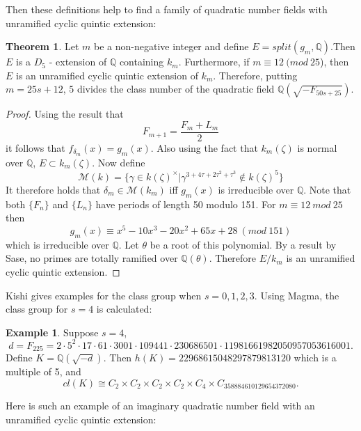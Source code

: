 \documentclass[12pt]{extarticle}
\newcommand{\Q}{\mathbb{Q}}
\newcommand{\<}{\langle}
\renewcommand{\>}{\rangle}
\theoremstyle{definition}
\newtheorem{theorem}{Theorem}
\newtheorem{example}{Example}
\begin{document}
Then these definitions help to find a family of quadratic number fields with unramified cyclic quintic extension:
\begin{theorem}
    Let $m$ be a non-negative integer and define $E = split(g_m,\Q)$.Then $E$ is a $D_5$ - extension
of $\Q$ containing $k_m$. Furthermore, if $m \equiv 12 \:(mod\:25$), then $E$ is an unramified cyclic quintic extension of $k_m$. Therefore, putting $m = 25s + 12$, $5$ divides the class number of the quadratic field $\Q(\sqrt{-F_{50s+25}})$.
\end{theorem}
\begin{proof}
Using the result that \begin{equation}
    F_{m+1}= \frac{F_m + L_m}{2}
\end{equation}
it follows that $f_{\delta_m}(x) = g_m(x)$. Also using the fact that $k_m(\zeta)$ is normal over $\Q$, $E\subset k_m(\zeta)$. Now define \begin{equation}
    \mathcal{M}(k)=\{\gamma \in k(\zeta)^{\times}|\gamma^{3+4\tau+2\tau^{2}+\tau^3}\notin k(\zeta)^5\}
\end{equation}
It therefore holds that $\delta_m \in \mathcal{M}(k_m)$ iff $g_m(x)$ is irreducible over $\Q$. Note that both $\{F_n\}$ and $\{L_n\}$ have periods of length 50 modulo 151. For $m\equiv12 \: mod \: 25$ then \begin{equation}
    g_m(x) \equiv x^5 - 10x^3 - 20x^2 + 65x + 28\:(mod \:151)
\end{equation} which is irreducible over $\Q$. Let $\theta$ be a root of this polynomial. By a result by Sase, no primes are totally ramified over $\Q(\theta)$. Therefore $E/k_m$ is an unramified cyclic quintic extension. 
\end{proof}
Kishi gives examples for the class group when $s = 0,1,2,3$. Using Magma, the class group for $s=4$ is calculated:
\begin{example}
Suppose $s=4$, 
\begin{equation}
d = F_{225} = 2 \cdot 5^2 \cdot 17 \cdot 61 \cdot 3001 \cdot 109441 \cdot 230686501 \cdot11981661982050957053616001.
\end{equation} Define $K = \Q(\sqrt{-d})$.
Then $h(K) = 22968615048297879813120$ which is a multiple of 5, and 
\begin{equation}
cl(K) \cong C_2 \times C_2 \times C_2 \times C_2 \times C_4 \times C_{358884610129654372080}.
\end{equation} 
\end{example}
Here is such an example of an imaginary quadratic number field with an unramified cyclic quintic extension:
\end{document}
